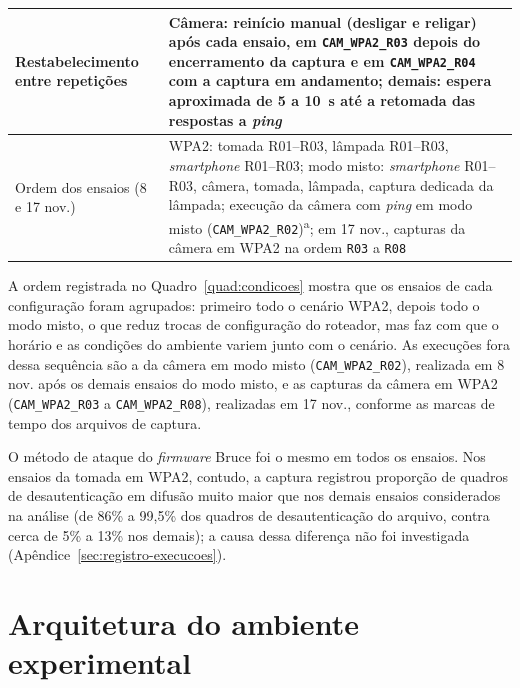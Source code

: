 \begin{quadro}[htbp]
\begin{tabular}{|>{\raggedright\arraybackslash}p{}|>{\raggedright\arraybackslash}p{}|}
Restabelecimento entre repetições & Câmera: reinício manual (desligar e religar) após cada ensaio, em \texttt{CAM\_WPA2\_R03} depois do encerramento da captura e em \texttt{CAM\_WPA2\_R04} com a captura em andamento; demais: espera aproximada de 5 a 10~s até a retomada das respostas a \textit{ping} \\ \hline
Ordem dos ensaios (8 e 17 nov.) & WPA2: tomada R01--R03, lâmpada R01--R03, \textit{smartphone} R01--R03; modo misto: \textit{smartphone} R01--R03, câmera, tomada, lâmpada, captura dedicada da lâmpada; execução da câmera com \textit{ping} em modo misto (\texttt{CAM\_WPA2\_R02})\textsuperscript{a}; em 17 nov., capturas da câmera em WPA2 na ordem \texttt{R03} a \texttt{R08} \\ \hline
\end{tabular}
\end{quadro}

A ordem registrada no Quadro~\ref{quad:condicoes} mostra que os ensaios de cada configuração foram agrupados: primeiro todo o cenário WPA2, depois todo o modo misto, o que reduz trocas de configuração do roteador, mas faz com que o horário e as condições do ambiente variem junto com o cenário. As execuções fora dessa sequência são a da câmera em modo misto (\texttt{CAM\_WPA2\_R02}), realizada em 8 nov. após os demais ensaios do modo misto, e as capturas da câmera em WPA2 (\texttt{CAM\_WPA2\_R03} a \texttt{CAM\_WPA2\_R08}), realizadas em 17 nov., conforme as marcas de tempo dos arquivos de captura.

O método de ataque do \textit{firmware} Bruce foi o mesmo em todos os ensaios. Nos ensaios da tomada em WPA2, contudo, a captura registrou proporção de quadros de desautenticação em difusão muito maior que nos demais ensaios considerados na análise (de 86\% a 99,5\% dos quadros de desautenticação do arquivo, contra cerca de 5\% a 13\% nos demais); a causa dessa diferença não foi investigada (Apêndice~\ref{sec:registro-execucoes}).

\section{Arquitetura do ambiente experimental}
\label{sec:arquitetura_ambiente}

